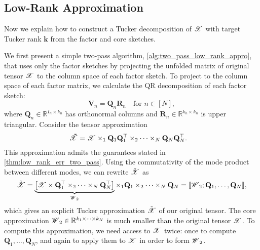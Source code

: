 \subsection{Low-Rank Approximation}
Now we explain how to construct a Tucker decomposition of $\T{X}$
with target Tucker rank $\mathbf{k}$
from the factor and core sketches.

We first present a simple two-pass algorithm, \ref{alg:two_pass_low_rank_appro},
that uses only the factor sketches
by projecting the unfolded matrix of original tensor $\T{X}$ to the column space of each factor sketch.
To project to the column space of each factor matrix, we calculate the QR decomposition of each factor sketch:
\begin{equation} \label{eqn:qr}
\mathbf{V}_n = \mathbf{Q}_n\mathbf{R}_n \quad\text{for $n \in [N]$},
\end{equation}
where $\mathbf{Q}_n \in \mathbb{R}^{I_n \times k_n}$ has orthonormal columns
and $\mathbf{R}_n \in \mathbb{R}^{k_n\times k_n}$ is upper triangular.
Consider the tensor approximation
\begin{equation} \label{eq:x_tilde}
\begin{aligned}
\T{\tilde{X}} &=\T{X}\times_1 \mathbf{Q}_1\mathbf{Q}_1^\top \times_2 \cdots \times_N \mathbf{Q}_N\mathbf{Q}_N^\top.
\end{aligned}
\end{equation}
This approximation admits the guarantees stated in \ref{thm:low_rank_err_two_pass}.
Using the commutativity of the mode product between different modes,
we can rewrite $\tilde{\T{X}}$ as
\begin{equation}
\label{eq: two-pass}
\tilde{\T{X}}= \underbrace{\left[\T{X}\times \mathbf{Q}_1^\top \times_2 \cdots \times_N \mathbf{Q}_N^\top\right]}_{\T{W}_2} \times_1 \mathbf{Q}_1 \times_2 \cdots \times_N \mathbf{Q}_N
= \llbracket \T{W}_2; \mathbf{Q}_1,\ldots,\mathbf{Q}_N \rrbracket,
\end{equation}
which gives an explicit Tucker approximation $\tilde{\T{X}}$ of our original tensor.
The core approximation $\T{W}_2 \in \mathbb{R}^{k_1 \times \dots \times k_N}$
is much smaller than the original tensor $\T{X}$.
To compute this approximation, we need access to $\T{X}$ twice:
once to compute $\mathbf{Q}_1,\ldots,\mathbf{Q}_N$,
and again to apply them to $\T{X}$ in order to form $\T{W}_2$.

